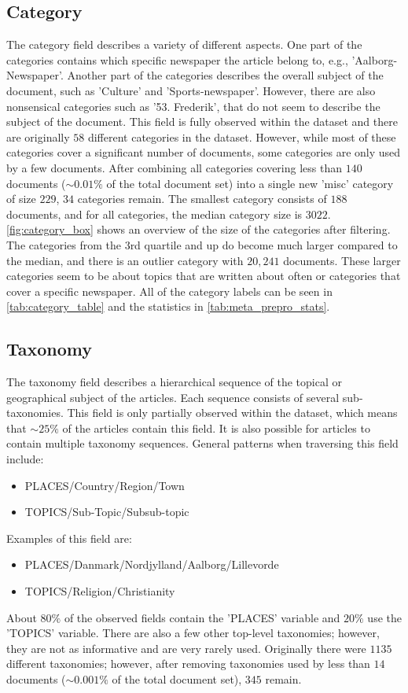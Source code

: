 \subsection{Category}
The category field describes a variety of different aspects.
One part of the categories contains which specific newspaper the article belong to, e.g., 'Aalborg-Newspaper'.
Another part of the categories describes the overall subject of the document, such as 'Culture' and 'Sports-newspaper'.
However, there are also nonsensical categories such as '53. Frederik', that do not seem to describe the subject of the document.
This field is fully observed within the dataset and there are originally $58$ different categories in the dataset.
However, while most of these categories cover a significant number of documents, some categories are only used by a few documents.
After combining all categories covering less than $140$ documents (${\sim}0.01\%$ of the total document set) into a single new 'misc' category of size $229$, $34$ categories remain.
The smallest category consists of $188$ documents, and for all categories, the median category size is $3022$.
\autoref{fig:category_box} shows an overview of the size of the categories after filtering.
The categories from the 3rd quartile and up do become much larger compared to the median, and there is an outlier category with $20,241$ documents.
These larger categories seem to be about topics that are written about often or categories that cover a specific newspaper.
All of the category labels can be seen in \autoref{tab:category_table} and the statistics in \autoref{tab:meta_prepro_stats}.

\subsection{Taxonomy}\label{sec:dataset_taxonomy}
The taxonomy field describes a hierarchical sequence of the topical or geographical subject of the articles.
Each sequence consists of several sub-taxonomies.
This field is only partially observed within the dataset, which means that ${\sim}25\%$ of the articles contain this field.
It is also possible for articles to contain multiple taxonomy sequences.
General patterns when traversing this field include:
\begin{itemize}
	\item PLACES/Country/Region/Town
	\item TOPICS/Sub-Topic/Subsub-topic
\end{itemize}
Examples of this field are:
\begin{itemize}
	\item PLACES/Danmark/Nordjylland/Aalborg/Lillevorde
	\item TOPICS/Religion/Christianity
\end{itemize}
About $80\%$ of the observed fields contain the 'PLACES' variable and $20\%$ use the 'TOPICS' variable.
There are also a few other top-level taxonomies; however, they are not as informative and are very rarely used.
Originally there were $1135$ different taxonomies; however, after removing taxonomies used by less than $14$ documents (${\sim}0.001\%$ of the total document set), $345$ remain.
